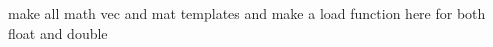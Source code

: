 
\begin{DoxyRefList}
\item[\label{todo__todo000001}%
\hypertarget{todo__todo000001}{}%
\-Member \hyperlink{classglutpp_1_1glsl_1_1uniform_a83c0f49028a3aed0072206192710d7f0}{glutpp\-:\-:glsl\-:\-:uniform\-:\-:load} (int, math\-::mat44)]make all math vec and mat templates and make a load function here for both float and double 
\end{DoxyRefList}